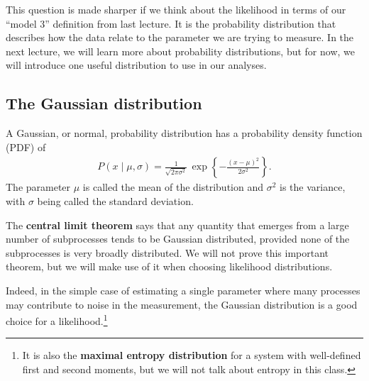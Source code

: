 This question is made sharper if we think about the likelihood in
terms of our ``model 3'' definition from last lecture.  It is the
probability distribution that describes how the data relate to the
parameter we are trying to measure.  In the next lecture, we will
learn more about probability distributions, but for now, we will
introduce one useful distribution to use in our analyses.

\subsection{The Gaussian distribution}
A Gaussian, or normal, probability distribution has a probability
density function (PDF) of
\begin{align}
  P(x \mid \mu, \sigma) = \frac{1}{\sqrt{2\pi\sigma^2}}\,
\exp\left\{-\frac{(x - \mu)^2}{2\sigma^2}\right\}.
\end{align}
The parameter $\mu$ is called the mean of the distribution and
$\sigma^2$ is the variance, with $\sigma$ being called the standard
deviation.

The \textbf{central limit theorem} says that any quantity that emerges
from a large number of subprocesses tends to be Gaussian distributed,
provided none of the subprocesses is very broadly distributed.  We
will not prove this important theorem, but we will make use of it when
choosing likelihood distributions.

Indeed, in the simple case of estimating a single parameter where many
processes may contribute to noise in the measurement, the Gaussian
distribution is a good choice for a likelihood.\footnote{It is also the
  \textbf{maximal entropy distribution} for a system with well-defined
  first and second moments, but we will not talk about entropy in this
  class.}

